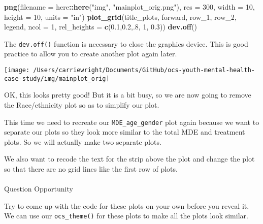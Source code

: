 \documentclass[
]{article}
\newenvironment{Shaded}{\begin{snugshade}}{\end{snugshade}}
\newcommand{\DataTypeTok}[1]{\textcolor[rgb]{0.13,0.29,0.53}{#1}}
\newcommand{\DecValTok}[1]{\textcolor[rgb]{0.00,0.00,0.81}{#1}}
\newcommand{\FloatTok}[1]{\textcolor[rgb]{0.00,0.00,0.81}{#1}}
\newcommand{\KeywordTok}[1]{\textcolor[rgb]{0.13,0.29,0.53}{\textbf{#1}}}
\newcommand{\NormalTok}[1]{#1}
\newcommand{\OperatorTok}[1]{\textcolor[rgb]{0.81,0.36,0.00}{\textbf{#1}}}
\newcommand{\StringTok}[1]{\textcolor[rgb]{0.31,0.60,0.02}{#1}}
\begin{document}
\begin{Shaded}
\begin{Highlighting}[]
\KeywordTok{png}\NormalTok{(}\DataTypeTok{filename =}\NormalTok{ here}\OperatorTok{::}\KeywordTok{here}\NormalTok{(}\StringTok{"img"}\NormalTok{, }\StringTok{"mainplot_orig.png"}\NormalTok{), }
         \DataTypeTok{res =} \DecValTok{300}\NormalTok{, }\DataTypeTok{width =} \DecValTok{10}\NormalTok{, }\DataTypeTok{height =} \DecValTok{10}\NormalTok{, }\DataTypeTok{units =} \StringTok{"in"}\NormalTok{)}
\KeywordTok{plot_grid}\NormalTok{(title_plots, }
\NormalTok{          forward,}
\NormalTok{          row_}\DecValTok{1}\NormalTok{,}
\NormalTok{          row_}\DecValTok{2}\NormalTok{,}
\NormalTok{          legend,}
          \DataTypeTok{ncol =} \DecValTok{1}\NormalTok{, }
          \DataTypeTok{rel_heights =} \KeywordTok{c}\NormalTok{(}\FloatTok{0.1}\NormalTok{,}\FloatTok{0.2}\NormalTok{,.}\DecValTok{8}\NormalTok{, }\DecValTok{1}\NormalTok{, }\FloatTok{0.3}\NormalTok{))}
\KeywordTok{dev.off}\NormalTok{()}
\end{Highlighting}
\end{Shaded}

The \texttt{dev.off()} function is necessary to close the graphics
device. This is good practice to allow you to create another plot again
later.

\begin{center}\texttt{[image: /Users/carriewright/Documents/GitHub/ocs-youth-mental-health-case-study/img/mainplot\_orig]} \end{center}

OK, this looks pretty good! But it is a bit busy, so we are now going to
remove the Race/ethnicity plot so as to simplify our plot.

This time we need to recreate our \texttt{MDE\_age\_gender} plot again
because we want to separate our plots so they look more similar to the
total MDE and treatment plots. So we will actually make two separate
plots.

We also want to recode the text for the strip above the plot and change
the plot so that there are no grid lines like the first row of plots.

\hypertarget{section-52}{%
\paragraph{}\label{section-52}}

Question Opportunity

Try to come up with the code for these plots on your own before you
reveal it. We can use our \texttt{ocs\_theme()} for these plots to make
all the plots look similar.
\end{document}
